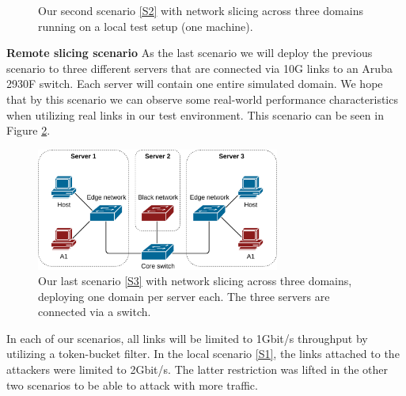 \begin{description}[style=multiline, labelwidth=0.7cm]
\begin{figure}[ht]
        \caption[Validation Scenario 2]{Our second scenario \ref{S2} with network slicing across three domains running on a local test setup (one machine).}
        \label{fig:scenario_2}
    \end{figure}
    \item[\namedlabel{S3}{S3}] \textbf{Remote slicing scenario} As the last scenario we will deploy the previous scenario to three different servers that are connected via 10G links to an Aruba 2930F switch. Each server will contain one entire simulated domain. We hope that by this scenario we can observe some real-world performance characteristics when utilizing real links in our test environment. This scenario can be seen in Figure \ref{fig:scenario_3}.
    \begin{figure}[ht]
        \centering
        \includegraphics[width=8cm]{images/chapter_7/scenario_3.png}
        \caption[Validation Scenario 3]{Our last scenario \ref{S3} with network slicing across three domains, deploying one domain per server each. The three servers are connected via a switch.}
        \label{fig:scenario_3}
    \end{figure}
\end{description}

In each of our scenarios, all links will be limited to 1Gbit/s throughput by utilizing a token-bucket filter. In the local scenario \ref{S1}, the links attached to the attackers were limited to 2Gbit/s. The latter restriction was lifted in the other two scenarios to be able to attack with more traffic.


